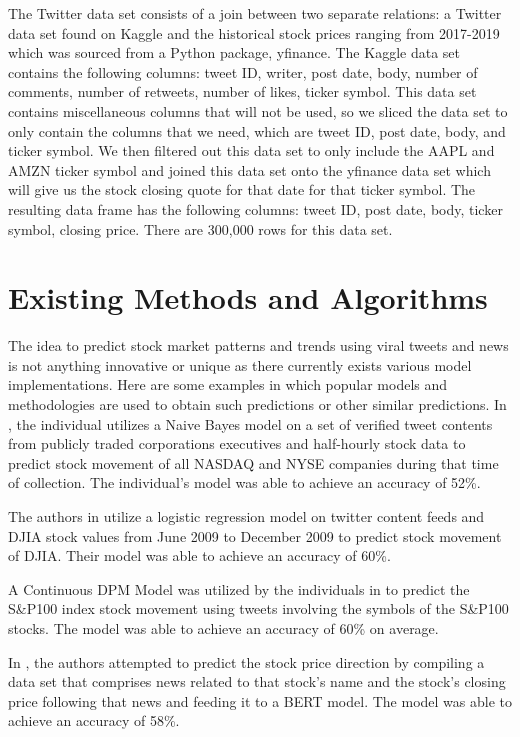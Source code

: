 \documentclass[conference]{IEEEtran}
\begin{document}
The Twitter data set consists of a join between two separate relations: a Twitter data set found on Kaggle and the historical stock prices ranging from 2017-2019 which was sourced from a Python package, yfinance. The Kaggle data set contains the following columns: tweet ID, writer, post date, body, number of comments, number of retweets, number of likes, ticker symbol. This data set contains miscellaneous columns that will not be used, so we sliced the data set to only contain the columns that we need, which are tweet ID, post date, body, and ticker symbol. We then filtered out this data set to only include the AAPL and AMZN ticker symbol and joined this data set onto the yfinance data set which will give us the stock closing quote for that date for that ticker symbol. The resulting data frame has the following columns: tweet ID, post date, body, ticker symbol, closing price. There are 300,000 rows for this data set.

\section{Existing Methods and Algorithms}
The idea to predict stock market patterns and trends using viral tweets and news is not anything innovative or unique as there currently exists various model implementations. Here are some examples in which popular models and methodologies are used to obtain such predictions or other similar predictions.
In \cite{b10}, the individual utilizes a Naive Bayes model on a set of verified tweet contents from publicly traded corporations executives and half-hourly stock data to predict stock movement of all NASDAQ and NYSE companies during that time of collection. The individual’s model was able to achieve an accuracy of 52\%.

The authors in \cite{b1} utilize a logistic regression model on twitter content feeds and DJIA stock values from June 2009 to December 2009 to predict stock movement of DJIA. Their model was able to achieve an accuracy of 60\%.

A Continuous DPM Model was utilized by the individuals in \cite{b9} to predict the S\&P100 index stock movement using tweets involving the symbols of the S\&P100 stocks. The model was able to achieve an accuracy of 60\% on average.

In \cite{b15}, the authors attempted to predict the stock price direction by compiling a data set that comprises news related to that stock’s name and the stock’s closing price following that news and feeding it to a BERT model. The model was able to achieve an accuracy of 58\%.
\end{document}
